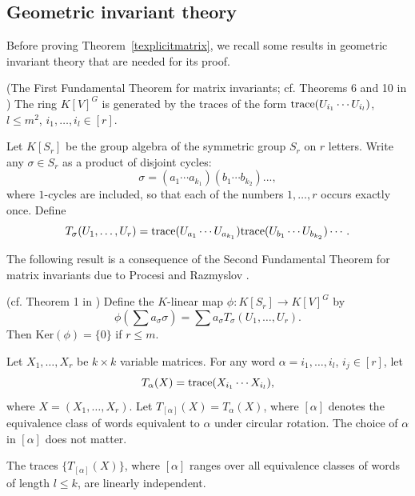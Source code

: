 \documentclass[11pt]{article}
\begin{document}
\subsection{Geometric invariant theory}
Before proving Theorem~\ref{texplicitmatrix}, we recall some results in  geometric invariant theory
that are needed for its proof. 


\begin{theorem} \cite{procesimatrix,razmyslov,formanek1} (The First Fundamental Theorem for  matrix
invariants; cf. Theorems 6 and 10 in \cite{formanek1}) \label{tprf}
The ring $K[V]^G$ is generated by the traces of the form ${\mbox {trace}}(U_{i_1}\cdots U_{i_l})$, $l \le m^2$, 
$i_1,\ldots,i_l \in [r]$. 
\end{theorem}

Let $K[S_r]$ be the group algebra of the symmetric group $S_r$ on $r$ letters. Write any $\sigma \in S_r$ as a product of
disjoint cycles:
\[ \sigma = (a_1 \cdots a_{k_1}) (b_1 \cdots b_{k_2}) ...,\] 
where $1$-cycles are included, so that each of the numbers $1,\ldots,r$ occurs exactly once. 
Define
\begin{equation} \label{eqtsigma}
 T_\sigma(U_1,\ldots,U_r) = {\mbox {trace}}(U_{a_1} \cdots U_{a_{k_1}}) {\mbox {trace}}(U_{b_1} \cdots U_{b_{k_2}}) \cdots.
\end{equation}

The following result is a consequence of the Second Fundamental Theorem for 
matrix invariants due to Procesi and Razmyslov \cite{procesimatrix,razmyslov}.

\begin{theorem} (cf. Theorem 1 in \cite{formanek1}) \label{tprocesisecond} 
Define the $K$-linear map 
$\phi:K[S_r] \rightarrow K[V]^G$ by 
\[ \phi(\sum a_\sigma \sigma)= \sum a_\sigma T_\sigma(U_1,\ldots,U_r).\] 
Then $\mbox{Ker} (\phi)=\{0\}$ if $r \le m$. 
\end{theorem}

Let $X_1,\ldots,X_r$ be $k \times k$ variable matrices. 
For any word $\alpha=i_1,\ldots,i_l$, $i_j \in [r]$, 
let 
\begin{equation}  \label{eqtracemono} 
T_\alpha(X)={\mbox {trace}}(X_{i_1}\cdots X_{i_l}),
\end{equation} 
where $X=(X_1,\ldots,X_r)$.  Let  $T_{[\alpha]}(X)=T_\alpha(X)$, where
$[\alpha]$ denotes the equivalence class of words equivalent to $\alpha$ under circular rotation. 
The choice of $\alpha$ in $[\alpha]$ does not matter. 

\begin{cor} \label{cprocesi} 
The traces $\{T_{[\alpha]}(X)\}$, where  $[\alpha]$ ranges over all equivalence classes of 
words of length  $l \le k$,  are linearly independent.
\end{cor} 
\end{document}
